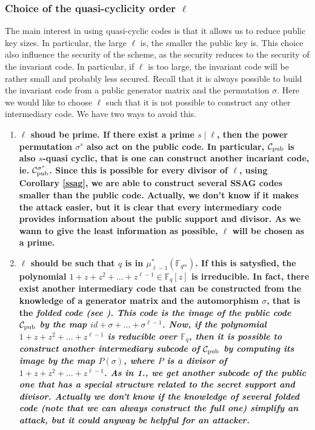 \documentclass[10pt]{article}
\newcommand{\s}{\vspace{0.3cm}}
\newcommand{\C}{\mathcal{C}}
\newcommand{\fqm}{\mathbb{F}_{q^m}}
\newcommand{\fq}{\mathbb{F}_q}
\begin{document}
\s

\subsubsection{Choice of the quasi-cyclicity order $\ell$}

\s

The main interest in using quasi-cyclic codes is that it allows us to reduce public key sizes. In particular, the large $\ell$ is, the smaller the public key is. This choice also influence the security of the scheme, as the security reduces to the security of the invariant code. In particular, if $\ell$ is too large, the invariant code will be rather small and probably less secured. Recall that it is always possible to build the invariant code from a public generator matrix and the permutation $\sigma$. Here we would like to choose $\ell$ such that it is not possible to construct any other intermediary code. We have two ways to avoid this.

\s

\begin{enumerate}
\item \bf{$\ell$ shoud be prime}. \rm If there exist a prime $s \mid \ell$, then the power permutation $\sigma^s$ also act on the public code. In particular, $\C_{\rm pub}$ is also $s$-quasi cyclic, that is one can construct another incariant code, ie. $\C_{\rm pub}^{\sigma^s}$. Since this is possible for every divisor of $\ell$, using Corollary \ref{ssag}, we are able to construct several SSAG codes smaller than the public code. Actually, we don't know if it makes the attack easier, but it is clear that every intermediary code provides information about the public support and divisor. As we wann to give the least information as possible, $\ell$ will be chosen as a prime.

\item \bf{$\ell$ should be such that $q$ is in $\mu_{\ell -1}^*(\fqm)$}. \rm If this is satysfied, the polynomial $1+z+z^2+...+z^{\ell-1} \in \fq[z]$ is irreducible. In fact, there exist another intermediary code that can be constructed from the knowledge of a generator matrix and the automorphism $\sigma$, that is the \it{folded code} \rm (see \cite{FOP}). This code is the image of the public code $\C_{\rm pub}$ by the map $id+\sigma+...+\sigma^{\ell-1}$. Now, if the polynomial $1+z+z^2+...+z^{\ell-1}$ is reducible over $\fq$, then it is possible to construct another intermediary subcode of $\C_{\rm pub}$ by computing its image by the map $P(\sigma)$, where $P$ is a divisor of $1+z+z^2+...+z^{\ell-1}$. As in 1., we get another subcode of the public one that has a special structure related to the secret support and divisor. Actually we don't know if the knowledge of several folded code (note that we can always construct the full one) simplify an attack, but it could anyway be helpful for an attacker.
\end{enumerate}
\end{document}
